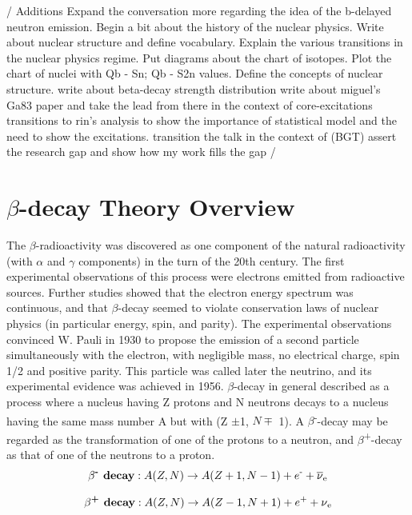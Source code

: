 \documentclass[a4paper,12pt,twoside]{report}
\begin{document}
 / Additions
 Expand the conversation more regarding the idea of the b-delayed neutron emission.
 Begin a bit about the history of the nuclear physics.
 Write about nuclear structure and define vocabulary.
 Explain the various transitions in the nuclear physics regime. 
 Put diagrams about the chart of isotopes. 
 Plot the chart of nuclei with Qb - Sn; Qb - S2n values.
 Define the concepts of nuclear structure.
 write about beta-decay strength distribution
 write about miguel's Ga83 paper and take the lead from there in the context of core-excitations
 transitions to  rin's analysis to show the importance of statistical model and the need to show the excitations.
 transition the talk in the context of (BGT)
 assert the research gap and show how my work fills the gap
 /
\section{$\beta$-decay Theory Overview}
The $\beta$-radioactivity was discovered as one component of the natural radioactivity (with $\alpha$ and $\gamma$ components) in the turn of the 20th century. The first experimental observations of this process were electrons emitted from radioactive sources. Further studies showed that the electron energy spectrum was continuous, and that $\beta$-decay seemed to violate conservation laws of nuclear physics (in particular energy, spin, and parity). The experimental observations convinced W. Pauli in 1930 to propose the emission of a second particle simultaneously with the electron, with negligible mass, no electrical charge, spin 1/2 and positive parity. This
particle was called later the neutrino, and its experimental evidence was achieved in 1956. 
$\beta$-decay in general described as a process where a nucleus having Z protons and N neutrons decays to a nucleus having the same mass number A but with (Z $\pm$1, $N\mp$ 1). A $\beta$\textsuperscript{-}-decay may be regarded as the transformation of one of the protons to a neutron, and $\beta$\textsuperscript{+}-decay as that of one of the neutrons to a proton.
\begin{equation}
\textbf{$\beta$\textsuperscript{-} decay}: A(Z,N) \to A(Z + 1, N-1) + e\textsuperscript{-} + \overline{\nu}\textsubscript{e}
\end{equation}

\begin{equation}
\textbf{$\beta$\textsuperscript{+} decay}: A(Z,N) \to A(Z-1 , N+1) + e\textsuperscript{+} + {\nu}\textsubscript{e}
\end{equation}
\end{document}
